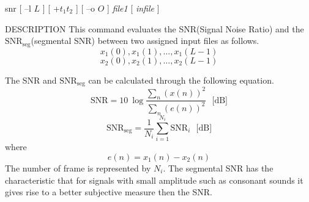 
\begin{synopsis}
\item [snr] [ --l $L$ ] [ +$t_1 t_2$ ] [ --o $O$ ] {\em file1} [ {\em infile} ] 
\end{synopsis}

\begin{qsection}{DESCRIPTION}
This command evaluates the SNR(Signal Noise Ratio) and
the $\mbox{SNR}_{\mbox{seg}}$(segmental SNR)
between two assigned input files as follows.
\begin{displaymath}
  x_1(0),x_1(1),\ldots,x_1(L-1)
\end{displaymath}
\begin{displaymath}
  x_2(0),x_2(1),\ldots,x_2(L-1)
\end{displaymath}
\par
The SNR and $\mbox{SNR}_{\mbox{seg}}$ can be calculated
through the following equation.
\begin{displaymath}
\mbox{SNR} = 10~\log \frac{\displaystyle\sum_{n} ( x(n) )^{2}}
{\displaystyle\sum_{n} (e(n))^{2}}~~~\mbox{[dB]}
\end{displaymath}
\begin{displaymath}
\mbox{SNR}_{\mbox{seg}} = \frac{1}{N_{i}} \sum_{i = 1}^{N_{i}}
\mbox{SNR}_{i} ~~~\mbox{[dB]}
\end{displaymath}
where
\begin{displaymath}
e(n) = x_1(n) - x_2(n)
\end{displaymath}
The number of frame is represented by $N_i$.
The segmental SNR has the characteristic that
for signals with small amplitude such as consonant sounds
it gives rise to a better
subjective measure then the SNR.
\end{qsection}

